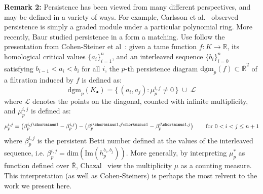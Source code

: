 \documentclass[10pt]{article}
\newcommand{\+}{%
	\raisebox{0.18ex}{\scaleobj{0.55}{+}}
}
\newtheorem{definition}{Definition}
\newtheorem{remark}{Remark}
\begin{document}
\textbf{Remark 2:} Persistence has been viewed from many different perspectives, and may be defined in a variety of ways. For example, Carlsson et al.~\cite{} observed persistence is simply a graded module under a particular polynomial ring. More recently, Baur studied persistence in a form a matching. Use follow the presentation from Cohen-Steiner et al~\cite{}: given a tame function $f: K \to \mathbb{R}$, its homological critical values $\{ a_i \}_{i=1}^n$, and an interleaved sequence $\{ b_i \}_{i=0}^n$ satisfying $b_{i-1} < a_i < b_i$ for all $i$, the $p$-th persistence diagram $\mathrm{dgm}_p(f) \subset \bar{\mathbb{R}}^2$ of a filtration induced by $f$ is defined as: 
\begin{equation}
\mathrm{dgm}_p(K_\bullet) = \{ \, (a_i, a_j) :  \mu_p^{i,j} \neq 0 \, \} \; \cup \; \mathcal{L}	
\end{equation}
where $\mathcal{L}$ denotes the points on the diagonal, counted with infinite multiplicity, and $\mu_p^{i,j}$ is defined as: 
\begin{equation}\label{eq:multiplicity}
	\mu_p^{i,j} = \left(\beta_p^{i,j\shortminus1} - \beta_p^{i,j} \right) - \left(\beta_p^{i\shortminus1,j\shortminus1} - \beta_p^{i\shortminus1,j} \right) \quad\quad \text{for } 0 < i < j \leq n+ 1
\end{equation}
where $\beta_p^{i,j}$ is the persistent Betti number defined at the values of the interleaved sequence, i.e. $\beta_p^{i,j} = \mathrm{dim}(\mathrm{Im}(h_p^{b_i, b_j}))$. More generally, by interpreting $\mu_p^\ast$ as function defined over $\bar{\mathbb{R}}$, Chazal~\cite{} view the multiplicity $\mu$ as a counting measure. This interpretation (as well as Cohen-Steiners) is perhaps the most relvent to the work we present here. 
\end{document}
